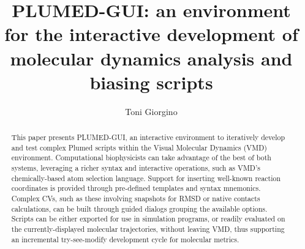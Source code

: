 \documentclass[preprint,12pt]{elsarticle}
\newcommand{\mytitle}{PLUMED-GUI: an environment for the interactive development 
  of molecular dynamics analysis and biasing scripts}
\begin{document}
\begin{frontmatter}


\title{\mytitle}
\author{Toni Giorgino}
\address{Institute of Biomedical Engineering (ISIB),\\ 
National Research Council of Italy (CNR),\\
Padua, Italy}




\begin{abstract}
  This paper presents PLUMED-GUI, an interactive environment to
  iteratively develop and test complex Plumed scripts within the
  Visual Molecular Dynamics (VMD) environment. Computational
  biophysicists can take advantage of the best of both systems,
  leveraging a richer syntax and interactive operations, such as VMD's
  chemically-based atom selection language.  Support for inserting
  well-known reaction coordinates is provided through pre-defined
  templates and syntax mnemonics. Complex CVs, such as these involving
  snapshots for RMSD or native contacts calculations, can be built
  through guided dialogs grouping the available options.  Scripts can
  be either exported for use in simulation programs, or readily
  evaluated on the currently-displayed molecular trajectories, without
  leaving VMD, thus supporting an incremental try-see-modify 
  development cycle for molecular metrics.
\end{abstract}


\end{frontmatter}
\end{document}
